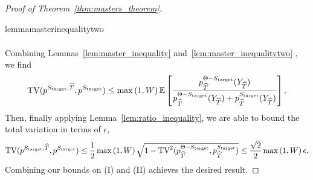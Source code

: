 \begin{proof}[Proof of Theorem~\ref{thm:masters_theorem}]
\begin{restatable}{lemma}{masterinequalitytwo}
\begin{align*}
\end{align*}
\end{restatable} 
\noindent Combining Lemmas~\ref{lem:master_inequality} and~\ref{lem:master_inequalitytwo} , we find 
\begin{align*}
\mathrm{TV}(p^{S_{\mathrm{target}},\widehat{T}},p^{S_{\mathrm{target}}}) \leq \max\left(1,W\right) \mathbb{E}\left[ \frac{p^{\Theta-S_{\mathrm{target}}}_{\widehat{T}}(Y_{\widehat{T}})}{ p^{\Theta-S_{\mathrm{target}}}_{\widehat{T}}(Y_{\widehat{T}})+p^{S_{\mathrm{target}}}_{\widehat{T}}(Y_{\widehat{T}})}\right]. 
\end{align*}
Then, finally applying Lemma~\ref{lem:ratio_inequality}, we are able to bound the total variation in terms of $\epsilon$, 
\begin{align*}
\mathrm{TV}(p^{S_{\mathrm{target}},\widehat{T}},p^{S_{\mathrm{target}}}) \leq \frac{1}{2}\max\left(1,W\right) \sqrt{1-\mathrm{TV}^2(p^{\Theta-S_{\mathrm{target}}}_{\widehat{T}},p^{S_{\mathrm{target}}}_{\widehat{T}})}\leq \frac{\sqrt{2}}{2}\max\left(1,W\right) \epsilon.
\end{align*}
\noindent Combining our bounds on (I) and (II) achieves the desired result.
\end{proof}

